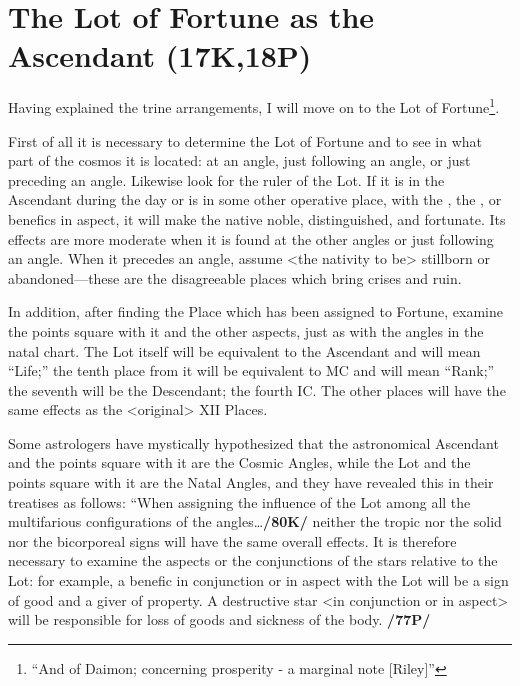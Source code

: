 \section{The Lot of Fortune as the Ascendant (17K,18P)}
Having explained the trine arrangements, I will move on to the Lot of Fortune\footnote{``And of Daimon; concerning prosperity - a marginal note [Riley]''}. 

First of all it is necessary to determine the Lot of Fortune and to see in what part of the cosmos it is located: at an angle, just following an angle, or just preceding an angle. Likewise look for the ruler of the Lot. If it is in the Ascendant during the day or is in some other operative place, with the \Sun, the \Moon, or benefics in aspect, it will make the native noble, distinguished, and fortunate. Its effects are more moderate when it is found at the other angles or just following an angle.  \mndl When it precedes an angle, assume <the nativity to be> stillborn or abandoned—these are the disagreeable places which bring crises and ruin.

In addition, after finding the Place which has been assigned to Fortune, examine the points square with it and the other aspects, just as with the angles in the natal chart. The Lot itself will be equivalent to the Ascendant and will mean “Life;” the tenth place from it will be equivalent to MC and will mean “Rank;” the seventh will be the Descendant; the fourth IC. The other places will have the same effects as the
<original> XII Places. 

Some astrologers have mystically hypothesized that the astronomical Ascendant and the points square with it are the Cosmic Angles, while the Lot and the points square with it are the Natal Angles, and they have revealed this in their treatises as follows: “When assigning the influence of the
Lot among all the multifarious configurations of the angles\ldots \textbf{/80K/} neither the tropic nor the solid nor the bicorporeal signs will have the same overall effects. It is therefore necessary to examine the aspects or the
conjunctions of the stars relative to the Lot: for example, a benefic in conjunction or in aspect with the Lot will be a sign of good and a giver of property. A destructive star <in conjunction or in aspect> will be responsible for loss of goods and sickness of the body. \textbf{/77P/}

\newpage